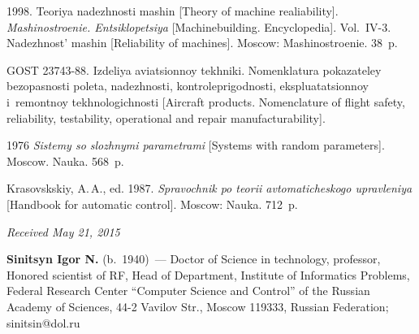 \begin{multicols}{2}
{{\begin{thebibliography}{99}
 1998.
{Teoriya nadezhnosti mashin}  [Theory of machine realiability].
\textit{Mashinostroenie.  Entsiklopetsiya} [Machinebuilding.
Encyclopedia]. Vol.~IV-3.
Nadezhnost' mashin [Reliability of machines]. Moscow:  Mashi\-no\-stro\-enie.
38~p.

GOST 23743-88. Izdeliya aviatsionnoy tekhniki.
Nomenklatura pokazateley bezopasnosti poleta, nadezhnosti,
kontroleprigodnosti, ekspluatatsionnoy i~remontnoy tekhnologichnosti
[Aircraft products. Nomenclature of flight safety, reliability, 
testability, operational and repair manufacturability].


 1976
\textit{Sistemy so slozhnymi parametrami} [Systems with random parameters].
Moscow. Nauka. 568~p.

Krasovskskiy, A.\,A., ed. 1987.
 \textit{Spravochnik po teorii avtomaticheskogo upravleniya}
 [Handbook for automatic control].  Moscow:  Nauka. 712~p.

\end{thebibliography}

 }
 }

\end{multicols}

\vspace*{-3pt}

\hfill{\small\textit{Received May 21, 2015}}

\Contrl

\noindent
\textbf{Sinitsyn Igor N.} (b.\ 1940)~---
Doctor of Science in technology, professor, Honored scientist of RF,
Head of Department, Institute of Informatics Problems,
Federal Research Center ``Computer Science and Control'' of
the Russian Academy of Sciences, 44-2 Vavilov Str.,
Moscow 119333, Russian Federation; sinitsin@dol.ru

\label{end\stat}


\renewcommand{\bibname}{\protect\rm Литература}